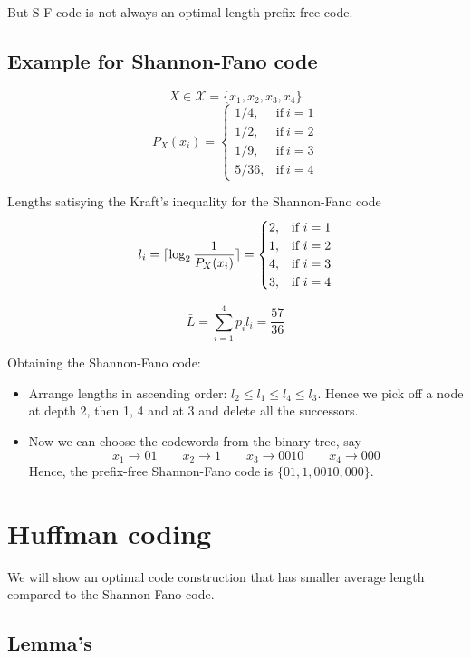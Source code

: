\documentclass{article}
\DeclarePairedDelimiter{\ceil}{\lceil}{\rceil}
\begin{document}
But S-F code is not always an optimal length prefix-free code.

\subsection{Example for Shannon-Fano code}
$$ X \in \mathcal{X}= \{ x_1,x_2,x_3,x_4 \}$$
\begin{equation*}
        P_X (x_i)=
        \begin{cases}
          1/4, & \text{if}\ i=1 \\
          1/2, & \text{if}\ i=2 \\
          1/9, & \text{if}\ i=3 \\
          5/36, & \text{if}\ i=4
        \end{cases}
    \end{equation*}

Lengths satisying the Kraft's inequality for the Shannon-Fano code
$$ l_i= \ceil{\log_2 \frac{1}{P_X (x_i)}}= \begin{cases}
  2, & \text{if}\ i=1 \\
  1, & \text{if}\ i=2 \\
  4, & \text{if}\ i=3 \\
  3, & \text{if}\ i=4
\end{cases} $$

$$ \bar{L}= \sum_{i=1}^{4} p_i l_i = \frac{57}{36}$$

Obtaining the Shannon-Fano code:
\begin{itemize}
    \item Arrange lengths in ascending order: $l_2 \leq l_1 \leq l_4 \leq l_3$. Hence we pick off a node at depth 2, then 1, 4 and at 3 and delete all the successors.

    \item Now we can choose the codewords from the binary tree, say
    $$ x_1 \to 01 \qquad x_2 \to 1 \qquad x_3 \to 0010 \qquad x_4 \to 000$$
    Hence, the prefix-free Shannon-Fano code is $\{ 01,1,0010,000\} $.
\end{itemize}

\section{Huffman coding}
We will show an optimal code construction that has smaller average length compared to the Shannon-Fano code.

\subsection{Lemma's}
\end{document}
